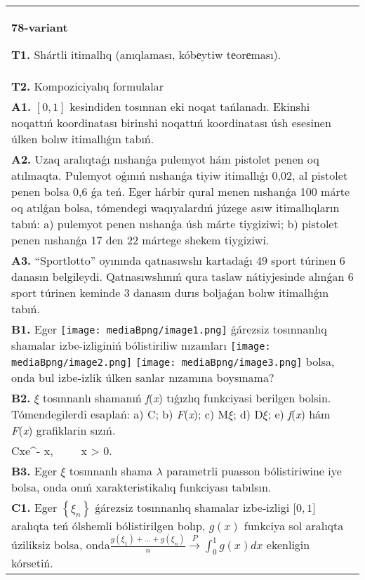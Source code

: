 \documentclass{article}
\begin{document}
\begin{tabular}{m{17cm}}
\textbf{78-variant}
\newline

\textbf{T1.} Shártli itimallıq (anıqlaması, kóbеytiw tеorеması).
 \\
\textbf{T2.} Kompoziciyalıq formulalar \\
\textbf{A1.} $\left[ 0,1 \right]$ kesindiden tosınnan eki noqat tańlanadı. Ekinshi noqattıń koordinatası birinshi noqattıń koordinatası úsh esesinen úlken bolıw itimallıǵın tabıń.
 \\
\textbf{A2.} Uzaq aralıqtaǵı nıshanǵa pulemyot hám pistolet penen oq atılmaqta. Pulemyot oǵınıń nıshanǵa tiyiw itimallıǵı 0,02, al pistolet penen bolsa 0,6 ǵa teń. Eger hárbir qural menen nıshanǵa 100 márte oq atılǵan bolsa, tómendegi waqıyalardıń júzege asıw itimallıqların tabıń: a) pulemyot penen nıshanǵa úsh márte tiygiziwi; b) pistolet penen nıshanǵa 17 den 22 mártege shekem tiygiziwi.
 \\
\textbf{A3.} “Sportlotto” oyınında qatnasıwshı kartadaǵı 49 sport túrinen 6 danasın belgileydi. Qatnasıwshınıń qura taslaw nátiyjesinde alınǵan 6 sport túrinen keminde 3 danasın durıs boljaǵan bolıw itimallıǵın tabıń.
 \\
\textbf{B1.} 
Eger \texttt{[image: mediaBpng/image1.png]} ǵárezsiz tosınnanlıq shamalar izbe-izliginiń bólistiriliw nızamları
\texttt{[image: mediaBpng/image2.png]} \texttt{[image: mediaBpng/image3.png]}
bolsa, onda bul izbe-izlik úlken sanlar nızamına boysınama?
 \\
\textbf{B2.} $\xi$ tosınnanlı shamanıń \emph{f}(\emph{x}) tıǵızlıq funkciyasi berilgen bolsin. Tómendegilerdi esaplań: a) C; b) \emph{F}(\emph{x}); c) M$\xi$; d) D$\xi$; e) \emph{f}(\emph{x}) hám \emph{F}(\emph{x}) grafiklarin sızıń.\(f(x) = \left\{ \begin{matrix}
\ \ \ \ \ \ \ \ 0,\ \ \ \ \ \ x \leq 0, \\
Cxe^{- x},\ \ \ \ \ x > 0.\ \ 
\end{matrix} \right.\ \)
 \\
\textbf{B3.} Eger \(\xi\) tosınnanlı shama \(\lambda\) parametrli puasson bólistiriwine iye bolsa, onda onıń xarakteristikalıq funkciyası tabılsın.
 \\
\textbf{C1.} Eger \(\left\{ \xi_{n} \right\}\) ǵárezsiz tosınnanlıq shamalar izbe-izligi \(\lbrack 0,1\rbrack\) aralıqta teń ólshemli bólistirilgen bolıp, \(g(x)\) funkciya sol aralıqta úziliksiz bolsa, onda\(\frac{g\left( \xi_{1} \right) + ... + g\left( \xi_{n} \right)}{n}\overset{P}{\rightarrow}\int_{0}^{1}{g(x)}dx\) ekenligin kórsetiń.

\end{tabular}
\end{document}
